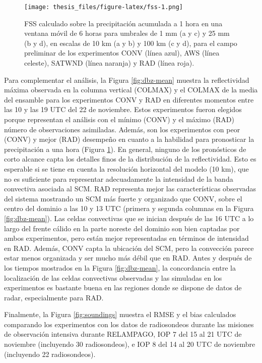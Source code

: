 \documentclass[12pt,oneside]{reedthesis}
\begin{document}
\begin{figure}
\centering
\texttt{[image: thesis\_files/figure-latex/fss-1.png]}
\caption{\label{fig:fss}FSS calculado sobre la precipitación acumulada a 1 hora en una ventana móvil de 6 horas para umbrales de 1 mm (a y c) y 25 mm (b y d), en escalas de 10 km (a y b) y 100 km (c y d), para el campo preliminar de los experimentos CONV (línea azul), AWS (línea celeste), SATWND (línea naranja) y RAD (línea roja).}
\end{figure}
Para complementar el análisis, la Figura \ref{fig:dbz-mean} muestra la reflectividad máxima observada en la columna vertical (COLMAX) y el COLMAX de la media del ensamble para los experimentos CONV y RAD en diferentes momentos entre las 10 y las 19 UTC del 22 de noviembre. Estos experimentos fueron elegidos porque representan el análisis con el mínimo (CONV) y el máximo (RAD) número de observaciones asimiladas. Además, son los experimentos con peor (CONV) y mejor (RAD) desempeño en cuanto a la habilidad para pronosticar la precipitación a una hora (Figura \ref{fig:fss}). En general, ninguno de los pronósticos de corto alcance capta los detalles finos de la distribución de la reflectividad. Esto es esperable si se tiene en cuenta la resolución horizontal del modelo (10 km), que no es suficiente para representar adecuadamente la intensidad de la banda convectiva asociada al SCM. RAD representa mejor las características observadas del sistema mostrando un SCM más fuerte y organizado que CONV, sobre el centro del dominio a las 10 y 13 UTC (primera y segunda columnas en la Figura \ref{fig:dbz-mean}). Las celdas convectivas que se inician después de las 16 UTC a lo largo del frente cálido en la parte noreste del dominio son bien captadas por ambos experimentos, pero están mejor representadas en términos de intensidad en RAD. Además, CONV capta la ubicación del SCM, pero la convección parece estar menos organizada y ser mucho más débil que en RAD. Antes y después de los tiempos mostrados en la Figura \ref{fig:dbz-mean}, la concordancia entre la localización de las celdas convectivas observadas y las simuladas en los experimentos es bastante buena en las regiones donde se dispone de datos de radar, especialmente para RAD.

Finalmente, la Figura \ref{fig:soundings} muestra el RMSE y el bias calculados comparando los experimentos con los datos de radiosondeos durante las misiones de observación intensiva durante RELAMPAGO, IOP 7 del 15 al 21 UTC de noviembre (incluyendo 30 radiosondeos), e IOP 8 del 14 al 20 UTC de noviembre (incluyendo 22 radiosondeos).
\end{document}
